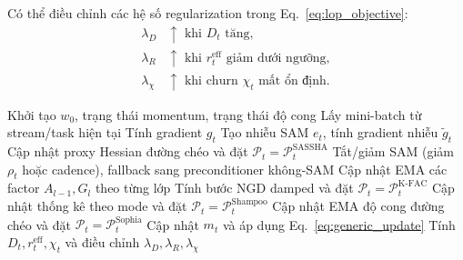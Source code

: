 \documentclass[11pt]{article}
\begin{document}
Có thể điều chỉnh các hệ số regularization trong Eq.~\eqref{eq:lop_objective}:
\begin{align}
\lambda_D &\uparrow \text{ khi } D_t \text{ tăng},\\
\lambda_R &\uparrow \text{ khi } r_t^{\mathrm{eff}} \text{ giảm dưới ngưỡng},\\
\lambda_\chi &\uparrow \text{ khi churn } \chi_t \text{ mất ổn định}.
\end{align}

\begin{algorithm}[t]
\caption{Huấn luyện bậc hai có ý thức plasticity (bản nháp)}
\begin{algorithmic}[1]
\State Khởi tạo $w_0$, trạng thái momentum, trạng thái độ cong
    \State Lấy mini-batch từ stream/task hiện tại
    \State Tính gradient $g_t$
        \State Tạo nhiễu SAM $e_t$, tính gradient nhiễu $\tilde g_t$
        \State Cập nhật proxy Hessian đường chéo và đặt $\mathcal{P}_t = \mathcal{P}^{\mathrm{SASSHA}}_t$
        \State Tắt/giảm SAM (giảm $\rho_t$ hoặc cadence), fallback sang preconditioner không-SAM
        \State Cập nhật EMA các factor $A_{l-1},G_l$ theo từng lớp
        \State Tính bước NGD damped và đặt $\mathcal{P}_t = \mathcal{P}^{\mathrm{K\text{-}FAC}}_t$
        \State Cập nhật thống kê theo mode và đặt $\mathcal{P}_t = \mathcal{P}^{\mathrm{Shampoo}}_t$
    \Else
        \State Cập nhật EMA độ cong đường chéo và đặt $\mathcal{P}_t = \mathcal{P}^{\mathrm{Sophia}}_t$
    \EndIf
    \State Cập nhật $m_t$ và áp dụng Eq.~\eqref{eq:generic_update}
    \State Tính $D_t, r_t^{\mathrm{eff}}, \chi_t$ và điều chỉnh $\lambda_D,\lambda_R,\lambda_\chi$
\EndFor
\end{algorithmic}
\end{algorithm}
\end{document}
